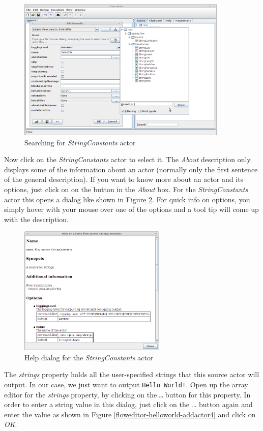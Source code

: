 \begin{figure}[htb]
  \centering
  \includegraphics[width=10.0cm]{images/floweditor-helloworld-addactor3.png}
  \caption{Searching for \textit{StringConstants} actor}
  \label{floweditor-helloworld-addactor3}
\end{figure}

Now click on the \textit{StringConstants} actor to select it. The \textit{About}
description only displays some of the information about an actor (normally only
the first sentence of the general description). If you want to know more about
an actor and its options, just click on on the  button in the
\textit{About} box. For the \textit{StringConstants} actor this opens a dialog
like shown in Figure \ref{floweditor-helloworld-actorhelp}. For quick info on
options, you simply hover with your mouse over one of the options and a tool tip
will come up with the description.

\begin{figure}[htb]
  \centering
  \includegraphics[width=7.0cm]{images/floweditor-helloworld-actorhelp.png}
  \caption{Help dialog for the \textit{StringConstants} actor}
  \label{floweditor-helloworld-actorhelp}
\end{figure}

The \textit{strings} property holds all the user-specified strings that this
source actor will output. In our case, we just want to output
\texttt{Hello World!}. Open up the array editor for the \textit{strings}
property, by clicking on the \texttt{\ldots} button for this property.
In order to enter a string value in this dialog, just click on the
\textit{\ldots} button again and enter the value as shown in Figure
\ref{floweditor-helloworld-addactor4} and click on \textit{OK}.

